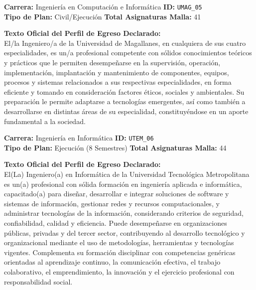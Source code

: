 \documentclass[11pt,a4paper]{article}
\begin{document}
\begin{tcolorbox}[fichaStyle, title={UNIVERSIDAD 05: Universidad de Magallanes (UMAG)}]
\small\sffamily
\textbf{Carrera:} Ingeniería en Computación e Informática \hfill \textbf{ID:} \texttt{UMAG\_05} \\
\textbf{Tipo de Plan:} Civil/Ejecución \hfill \textbf{Total Asignaturas Malla:} 41

\tcbline

\textbf{Texto Oficial del Perfil de Egreso Declarado:}\\[4pt]
{\small\rmfamily
El/la Ingeniero/a de la Universidad de Magallanes, en cualquiera de sus cuatro especialidades, es un/a profesional competente con sólidos conocimientos teóricos y prácticos que le permiten desempeñarse en la supervisión, operación, implementación, implantación y mantenimiento de componentes, equipos, procesos y sistemas relacionados a sus respectivas especialidades, en forma eficiente y tomando en consideración factores éticos, sociales y ambientales. Su preparación le permite adaptarse a tecnologías emergentes, así como también a desarrollarse en distintas áreas de su especialidad, constituyéndose en un aporte fundamental a la sociedad.
}
\end{tcolorbox}

\vspace{10pt}

\begin{tcolorbox}[fichaStyle, title={UNIVERSIDAD 06: Universidad Tecnológica Metropolitana (UTEM)}]
\small\sffamily
\textbf{Carrera:} Ingeniería en Informática \hfill \textbf{ID:} \texttt{UTEM\_06} \\
\textbf{Tipo de Plan:} Ejecución (8 Semestres) \hfill \textbf{Total Asignaturas Malla:} 44

\tcbline

\textbf{Texto Oficial del Perfil de Egreso Declarado:}\\[4pt]
{\small\rmfamily
El(La) Ingeniero(a) en Informática de la Universidad Tecnológica Metropolitana es un(a) profesional con sólida formación en ingeniería aplicada e informática, capacitado(a) para diseñar, desarrollar e integrar soluciones de software y sistemas de información, gestionar redes y recursos computacionales, y administrar tecnologías de la información, considerando criterios de seguridad, confiabilidad, calidad y eficiencia. Puede desempeñarse en organizaciones públicas, privadas y del tercer sector, contribuyendo al desarrollo tecnológico y organizacional mediante el uso de metodologías, herramientas y tecnologías vigentes. Complementa su formación disciplinar con competencias genéricas orientadas al aprendizaje continuo, la comunicación efectiva, el trabajo colaborativo, el emprendimiento, la innovación y el ejercicio profesional con responsabilidad social.
}
\end{tcolorbox}
\end{document}

